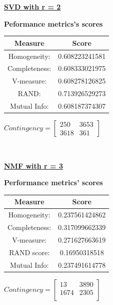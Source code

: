 \documentclass{report}
\begin{document}
\underline{\textbf{SVD with r = 2}} \\

\begin{center}
	\textbf{Peformance metrics's scores} \\  \vspace{10pt}
	\begin{tabular}{*{2}{c}}
		\toprule
		\textbf{Measure} & \textbf{Score} \\
		\midrule
		Homogeneity: & 0.608223241581 \\
		\midrule
		Completeness: & 0.608333021975 \\
		\midrule
		V-measure: & 0.608278126825 \\
		\midrule
		RAND: & 0.713926529273 \\
		\midrule
		Mutual Info: & 0.608187374307 \\
		\bottomrule
	\end{tabular}
	\qquad
	$Contingency = \left[\begin{array}{*{2}{c}}
		250 & 3653 \\
		3618 & 361 
			\end{array}\right]
		$
\end{center}
\\  \vspace{20pt}


\underline{\textbf{NMF with r = 3}} \\

\begin{center}
	\textbf{Performance metrics' scores} \\ \vspace{10pt}	
	\begin{tabular}{*{2}{c}}
		\toprule
		\textbf{Measure} & \textbf{Score} \\
		\midrule
		Homogeneity: & 0.237561424862 \\
		\midrule
		Completeness: 		& 0.317099662339 \\
		\midrule
		V-measure:			& 0.271627663619 \\
		\midrule
		RAND score: 		& 0.16950318518 \\
		\midrule
		Mutual Info: 		& 0.237491614778 \\
		\bottomrule
	\end{tabular}
	\qquad
	$Contingency = \left[\begin{array}{*{2}{c}}
		13 & 3890 \\
		1674 & 2305 \\
			\end{array}\right]
		$
\end{center}
\\  \vspace{20pt}
\end{document}
